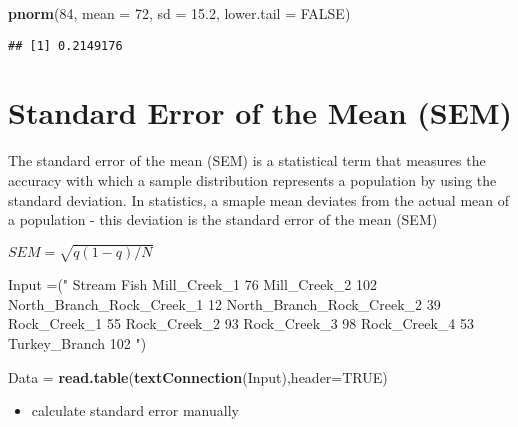 \documentclass[]{article}
\newenvironment{Shaded}{\begin{snugshade}}{\end{snugshade}}
\newcommand{\DataTypeTok}[1]{\textcolor[rgb]{0.13,0.29,0.53}{#1}}
\newcommand{\DecValTok}[1]{\textcolor[rgb]{0.00,0.00,0.81}{#1}}
\newcommand{\FloatTok}[1]{\textcolor[rgb]{0.00,0.00,0.81}{#1}}
\newcommand{\KeywordTok}[1]{\textcolor[rgb]{0.13,0.29,0.53}{\textbf{#1}}}
\newcommand{\NormalTok}[1]{#1}
\newcommand{\OtherTok}[1]{\textcolor[rgb]{0.56,0.35,0.01}{#1}}
\newcommand{\StringTok}[1]{\textcolor[rgb]{0.31,0.60,0.02}{#1}}
\providecommand{\tightlist}{%
  \setlength{\itemsep}{0pt}\setlength{\parskip}{0pt}}
\begin{document}
\begin{Shaded}
\begin{Highlighting}[]
\KeywordTok{pnorm}\NormalTok{(}\DecValTok{84}\NormalTok{, }\DataTypeTok{mean =} \DecValTok{72}\NormalTok{, }\DataTypeTok{sd =} \FloatTok{15.2}\NormalTok{, }\DataTypeTok{lower.tail =} \OtherTok{FALSE}\NormalTok{)}
\end{Highlighting}
\end{Shaded}

\begin{verbatim}
## [1] 0.2149176
\end{verbatim}

\hypertarget{standard-error-of-the-mean-sem}{%
\section{Standard Error of the Mean
(SEM)}\label{standard-error-of-the-mean-sem}}

The standard error of the mean (SEM) is a statistical term that measures
the accuracy with which a sample distribution represents a population by
using the standard deviation. In statistics, a smaple mean deviates from
the actual mean of a population - this deviation is the standard error
of the mean (SEM)

\(SEM = \sqrt{q(1-q)/N}\)

\begin{Shaded}
\begin{Highlighting}[]
\NormalTok{Input =(}\StringTok{"}
\StringTok{Stream                     Fish}
\StringTok{ Mill_Creek_1                76}
\StringTok{ Mill_Creek_2               102}
\StringTok{ North_Branch_Rock_Creek_1   12}
\StringTok{ North_Branch_Rock_Creek_2   39}
\StringTok{ Rock_Creek_1                55}
\StringTok{ Rock_Creek_2                93}
\StringTok{ Rock_Creek_3                98}
\StringTok{ Rock_Creek_4                53}
\StringTok{ Turkey_Branch              102}
\StringTok{"}\NormalTok{)}

\NormalTok{Data =}\StringTok{ }\KeywordTok{read.table}\NormalTok{(}\KeywordTok{textConnection}\NormalTok{(Input),}\DataTypeTok{header=}\OtherTok{TRUE}\NormalTok{)}
\end{Highlighting}
\end{Shaded}

\begin{itemize}
\tightlist
\item
  calculate standard error manually
\end{itemize}
\end{document}
